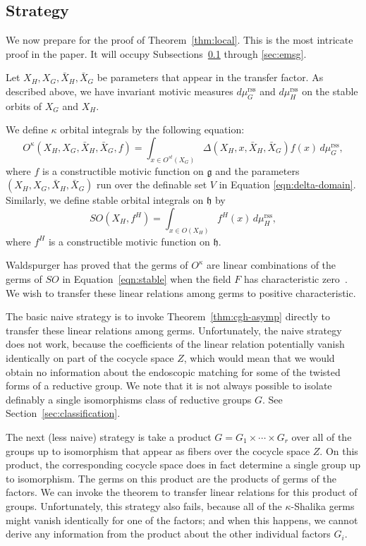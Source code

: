 \documentclass[12pt]{amsart}
\newcommand{\fg}{\mathfrak{g}}
\newcommand{\fh}{\mathfrak{h}}
\newcommand{\reg}{\mathrm{rss}}
\theoremstyle{plain}
\theoremstyle{definition}
\begin{document}
\subsection{Strategy}\label{sec:strategy}

We now prepare for the proof of Theorem~\ref{thm:local}.  This is the most intricate
proof in the paper.  It will occupy Subsections~\ref{sec:strategy} through \ref{sec:emsg}.

Let $X_H,X_G,\bar X_H,\bar X_G$ be parameters that appear in the
transfer factor.  As described above, we have invariant motivic 
measures $d\mu^\reg_G$
and $d\mu^\reg_H$ on the stable orbits of $X_G$ and $X_H$.

We define $\kappa$ orbital integrals by the following equation:
\begin{equation}\label{eqn:kappa}
O^\kappa(X_H,X_G,\bar X_H,\bar X_G,f) = \int_{x\in O^{st}(X_G)}
\Delta(X_H,x,\bar X_H,\bar X_G) f (x)\,d\mu^\reg_G,
\end{equation}
where $f$ is a constructible motivic function on $\fg$ and the
parameters $(X_H,X_G,\bar X_H,\bar X_G)$ run over the definable set
$V$ in Equation \ref{eqn:delta-domain}.  Similarly, we define stable
orbital integrals on $\fh$ by
\begin{equation}\label{eqn:stable}
SO(X_H,f^H) = \int_{x\in O(X_H)} f^H (x)\,d\mu^\reg_H,
\end{equation}
where $f^H$ is a constructible motivic function on $\fh$.

Waldspurger has proved that the germs of $O^\kappa$ are linear
combinations of the germs of $SO$ in Equation~\ref{eqn:stable} when
the field $F$ has characteristic zero~\cite{waldspurger1997lemme}.  We
wish to transfer these linear relations among germs to positive
characteristic.

The basic naive strategy is to invoke Theorem~\ref{thm:cgh-asymp}
directly to transfer these linear relations among germs.
Unfortunately, the naive strategy does not work, because the
coefficients of the linear relation potentially vanish identically on
part of the cocycle space $Z$, which would mean that we would obtain
no information about the endoscopic matching for some of the twisted
forms of a reductive group.  We note that it is not always possible to
isolate definably a single isomorphisms class of reductive groups $G$.
See Section~\ref{sec:classification}.

The next (less naive) strategy is take a product $G =
G_1\times\cdots\times G_r$ over all of the groups up to isomorphism
that appear as fibers over the cocycle space $Z$.  On this product,
the corresponding cocycle space does in fact determine a single group
up to isomorphism.  The germs on this product are the products of
germs of the factors.  We can invoke the theorem to transfer linear
relations for this product of groups.  Unfortunately, this strategy
also fails, because all of the $\kappa$-Shalika germs might vanish
identically for one of the factors; and when this happens, we cannot
derive any information from the product about the other individual
factors $G_i$.
\end{document}
